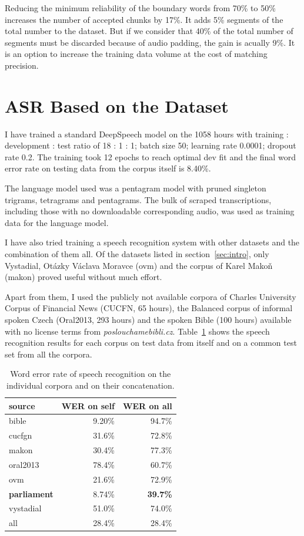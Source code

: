 \documentclass[runningheads]{llncs}
\begin{document}
Reducing the minimum reliability of the boundary words from 70\% to 50\% increases
the number of accepted chunks by 17\%. It adds 5\% segments
of the total number to the dataset. But if we consider that 40\% of the total
number of segments must be discarded because of audio padding, the gain is
acually 9\%. It is an option to increase the training data volume at the cost
of matching precision.

\section{ASR Based on the Dataset}

I have trained a standard DeepSpeech\cite{hannun2014deep} model on the 1058
hours with training :
development : test ratio of 18 : 1 : 1; batch size 50; learning rate 0.0001; dropout
rate 0.2. The training took 12 epochs to reach optimal dev fit and the final
word error rate on testing data from the corpus itself is 8.40\%.

The language model used was a pentagram model with pruned singleton trigrams,
tetragrams and pentagrams. The bulk of scraped transcriptions, including those
with no downloadable corresponding audio, was used as training data for the
language model.

I have also tried training a speech recognition system with other datasets and
the combination of them all. Of the datasets listed in
section~\ref{sec:intro}, only Vystadial, Otázky Václava Moravce (ovm) and the
corpus of Karel Makoň (makon) proved useful without much effort.

Apart from them, I used the publicly not available corpora of Charles University
Corpus of Financial News (CUCFN, 65 hours)\cite{byrne1999large}, the Balanced
corpus of informal spoken Czech (Oral2013, 293 hours)\cite{oral2013} and the
spoken Bible (100 hours) available with no license terms from {\em
poslouchamebibli.cz}. Table~\ref{tab:csasr:results} shows the speech recognition
results for each corpus on test data from itself and on a common test set from
all the corpora.

\begin{table}[htpb]
\begin{center}
\begin{tabular}{|l||r|r|}
\hline
source    & WER on self & WER on all \\
\hline
bible     & 9.20\%  & 94.7\% \\
cucfgn    & 31.6\%  & 72.8\% \\
makon     & 30.4\%  & 77.3\% \\
oral2013  & 78.4\%  & 60.7\% \\
ovm       & 21.6\%  & 72.9\% \\
\textbf{parliament}
          & 8.74\%  & \textbf{39.7\%} \\
vystadial & 51.0\%  & 74.0\% \\
\hline
all       & 28.4\%  & 28.4\% \\
\hline
\end{tabular}
\caption{Word error rate of speech recognition on the individual corpora and on
their concatenation.}\label{tab:csasr:results}
\end{center}
\end{table}
\end{document}
